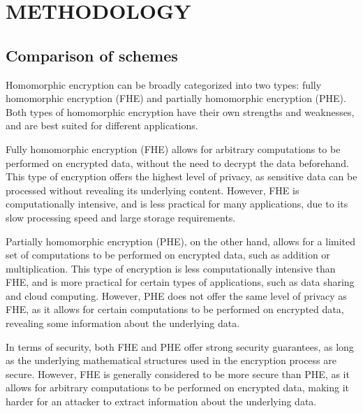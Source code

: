 \documentclass[a4paper,11pt]{report}
\begin{document}
\chapter{METHODOLOGY}
\section{Comparison of schemes}
Homomorphic encryption can be broadly categorized into two types: fully homomorphic encryption (FHE) and partially homomorphic encryption (PHE). Both types of homomorphic encryption have their own strengths and weaknesses, and are best suited for different applications.

Fully homomorphic encryption (FHE) allows for arbitrary computations to be performed on encrypted data, without the need to decrypt the data beforehand. This type of encryption offers the highest level of privacy, as sensitive data can be processed without revealing its underlying content. However, FHE is computationally intensive, and is less practical for many applications, due to its slow processing speed and large storage requirements.

Partially homomorphic encryption (PHE), on the other hand, allows for a limited set of computations to be performed on encrypted data, such as addition or multiplication. This type of encryption is less computationally intensive than FHE, and is more practical for certain types of applications, such as data sharing and cloud computing. However, PHE does not offer the same level of privacy as FHE, as it allows for certain computations to be performed on encrypted data, revealing some information about the underlying data.

In terms of security, both FHE and PHE offer strong security guarantees, as long as the underlying mathematical structures used in the encryption process are secure. However, FHE is generally considered to be more secure than PHE, as it allows for arbitrary computations to be performed on encrypted data, making it harder for an attacker to extract information about the underlying data.
\end{document}
